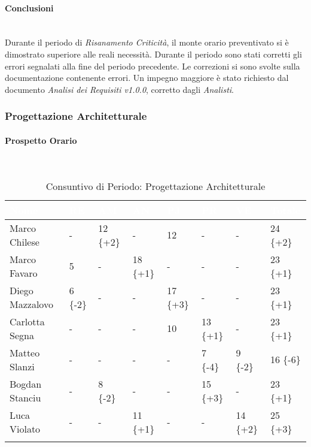 \paragraph{Conclusioni} ~\\

Durante il periodo di \textit{Risanamento Criticità}, il monte orario preventivato si è dimostrato superiore alle reali necessità. Durante il periodo sono stati corretti gli errori segnalati alla fine del periodo precedente. Le correzioni si sono svolte sulla documentazione contenente errori. Un impegno maggiore è stato richiesto dal documento \textit{Analisi dei Requisiti v1.0.0}, corretto dagli \textit{Analisti}. \\

\newpage

\subsubsection{Progettazione Architetturale}
\label{pa}

\paragraph{Prospetto Orario} ~\\

\begin{longtable}{|C{.30\textwidth}|C{.06\textwidth}|C{.06\textwidth}|C{.06\textwidth} | C{.06\textwidth}| C{.06\textwidth} | C{.06\textwidth} | C{.10\textwidth} |}
\hline
{}	\textbf{\textcolor{white}{Nome}} & \textbf{\textcolor{white}{RE}} & \textbf{\textcolor{white}{AM}} & \textbf{\textcolor{white}{AN}} & \textbf{\textcolor{white}{PJ}} & \textbf{\textcolor{white}{PR}} & \textbf{\textcolor{white}{VE}} & \textbf{\textcolor{white}{Totale}}\\
\hline 
Marco Chilese & - & 12 \{+2\} & - & 12 & - & - & 24 \{+2\} \\
\hline
{}Marco Favaro & 5 & - & 18 \{+1\}  & - & - & - & 23 \{+1\} \\
\hline
Diego Mazzalovo & 6 \{-2\}& - & - & 17 \{+3\} & - & - & 23 \{+1\} \\ 
\hline
{}Carlotta Segna & - & - & - & 10 & 13 \{+1\} & - & 23 \{+1\} \\
\hline
Matteo Slanzi & - & - & - & - & 7 \{-4\} & 9 \{-2\} & 16 \{-6\} \\
\hline
{}Bogdan Stanciu & - & 8 \{-2\}& - & - & 15 \{+3\} & - & 23 \{+1\} \\
\hline
Luca Violato & - & - & 11 \{+1\} & - & - & 14 \{+2\} & 25 \{+3\} \\
\hline 

\caption{Consuntivo di Periodo: Progettazione Architetturale}
\label{Distribuzione oraria del periodo di pa}
\end{longtable}


